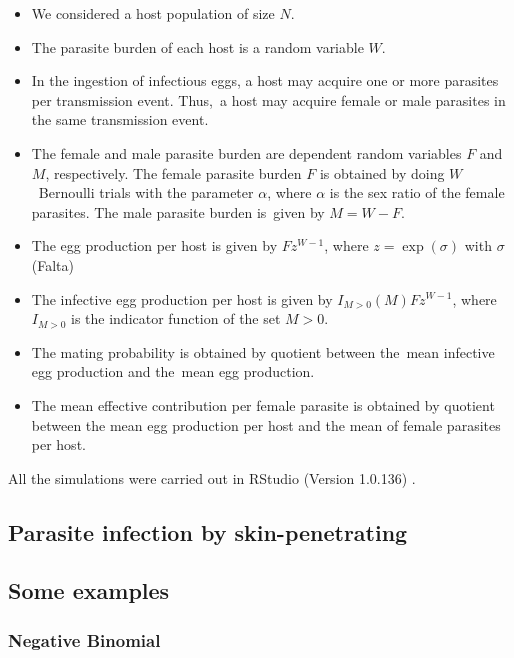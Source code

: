 \documentclass[12pt,a4paper]{article}
\theoremstyle{plain}%
\theoremstyle{definition}
\theoremstyle{remark}
\begin{document}
\begin{itemize}
	\item We considered a host population of size $N$.
	
	\item The parasite burden of each host is a random variable $W$.
	
	\item In the ingestion of infectious eggs, a host may acquire one or more parasites per transmission event. Thus, a host may acquire female or male parasites in the same transmission event.
	
	\item The female and male parasite burden are dependent random variables $F$ and $M$, respectively. The female parasite burden $F$ is obtained by doing $W$ Bernoulli trials with the parameter $\alpha$, where $\alpha$ is the sex ratio of the female parasites. The male parasite burden is given by $M=W-F$.  
	
	\item The egg production per host is given by $Fz^{W-1}$, where $z=\exp(\sigma)$ with $\sigma$ (Falta)
	
	\item The infective egg production per host is given by $I_{M>0}(M)Fz^{W-1}$, where $I_{M>0}$ is the indicator function of the set $M>0$.  
	
	\item The mating probability is obtained by quotient between the mean infective egg production and the mean egg production.

	\item The mean effective contribution per female parasite is obtained by quotient between the mean egg production per host and the mean of female parasites per host. 

	
\end{itemize}

All the simulations were carried out in RStudio (Version 1.0.136) .

\subsection{Parasite infection by skin-penetrating}

\subsection{Some examples}
\subsubsection{Negative Binomial}
\end{document}
